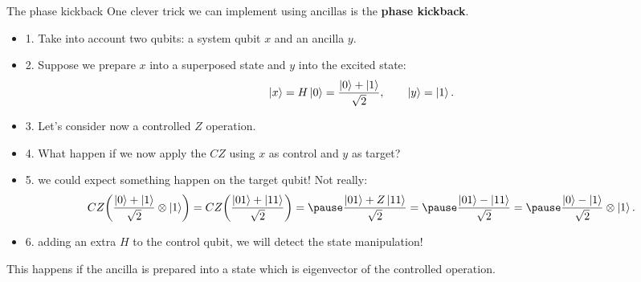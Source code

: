 \documentclass[aspectratio=169, 8pt, xcolor={svgnames}, hyperref={linkcolor=black}]{beamer}
\begin{document}
\begin{frame}{The phase kickback}
One clever trick we can implement using ancillas is the \textbf{phase kickback}.
\pause

\begin{itemize}[noitemsep]
\item{1.} Take into account two qubits: a system qubit $x$ and an ancilla $y$.  \pause
\item{2.} Suppose we prepare $x$ into a superposed state and $y$ into the excited state:
$$ \ket{x}=H\ket{0} = \frac{\ket{0}+\ket{1}}{\sqrt{2}}, \qquad \ket{y}=\ket{1}. $$ \pause
\item{3.} Let's consider now a controlled $Z$ operation. \pause
\item{4.} What happen if we now apply the $CZ$ using $x$ as control and $y$
as target? \pause
\item{5.} we could expect something happen on the target qubit! Not really: \pause
$$ CZ \biggl( \frac{\ket{0}+\ket{1}}{\sqrt{2}} \otimes \ket{1} \biggr)  = 
CZ \biggl( \frac{\ket{01}+\ket{11}}{\sqrt{2}} \biggr) = \pause
\frac{\ket{01}+Z\ket{11}}{\sqrt{2}} = \pause
\frac{\ket{01}-\ket{11}}{\sqrt{2}} = \pause
\frac{\ket{0}-\ket{1}}{\sqrt{2}} \otimes \ket{1}.
$$ \pause
\item{6.} adding an extra $H$ to the control qubit, we will detect the state manipulation!
\end{itemize}

\pause
\begin{tcolorbox}[colback=red!15, title=Important]
This happens if the ancilla is prepared into a state which is eigenvector of the 
controlled operation.
\end{tcolorbox}

\end{frame}
\end{document}
